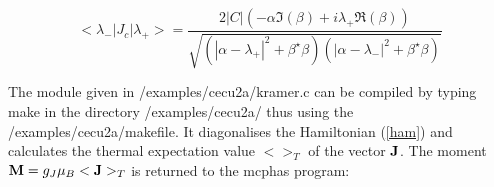\begin{equation}
<\lambda_-|J_c|\lambda_+>=
\frac{2|C| (-\alpha\Im(\beta)+i\lambda_+ \Re(\beta))}
{\sqrt{(|\alpha-\lambda_{+}|^2+\beta^{\star}\beta)
(|\alpha-\lambda_{-}|^2+\beta^{\star}\beta)}}
\end{equation}

The module given in {\prg /examples/cecu2a/kramer.c} can be compiled
by typing make in the directory {\prg /examples/cecu2a/} thus using the
{\prg  /examples/cecu2a/makefile}. It diagonalises
the Hamiltonian (\ref{ham}) and calculates the thermal expectation 
value $<>_T$ of the vector $\mathbf J$. The moment ${\mathbf M}=g_J \mu_B <{\mathbf J}>_T$
is returned to the mcphas program:


